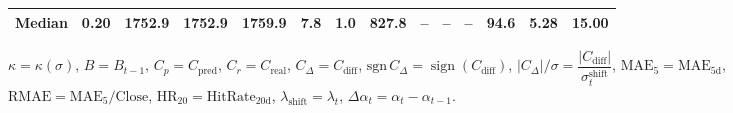 \begin{threeparttable}
{\begin{tabular}{lrrrrrrrrrrrrr}
 Median &     0.20 & 1752.9 & 1752.9 & 1759.9 &        7.8 &                      1.0 &               827.8 &         -- &        -- &             -- &             94.6 &            5.28 &                  15.00 \\
\bottomrule
\end{tabular}
}%
\begin{tablenotes}\footnotesize
\item $\kappa=\kappa(\sigma)$, $B=B_{t-1}$, $C_p=C_{\text{pred}}$, $C_r=C_{\text{real}}$, $C_\Delta=C_{\text{diff}}$, $\mathrm{sgn}\,C_\Delta=\operatorname{sign}(C_{\text{diff}})$, $|C_\Delta|/\sigma=\dfrac{|C_{\text{diff}}|}{\sigma_t^{\text{shift}}}$, $\mathrm{MAE}_5=\mathrm{MAE}_{5\text{d}}$, $\mathrm{RMAE}= \mathrm{MAE}_5 / \text{Close}$, $\mathrm{HR}_{20}=\mathrm{HitRate}_{20\text{d}}$, 
$\lambda_{\text{shift}}=\lambda_t$, 
$\Delta\alpha_t=\alpha_t-\alpha_{t-1}$.
\end{tablenotes}
\end{threeparttable}
\endgroup